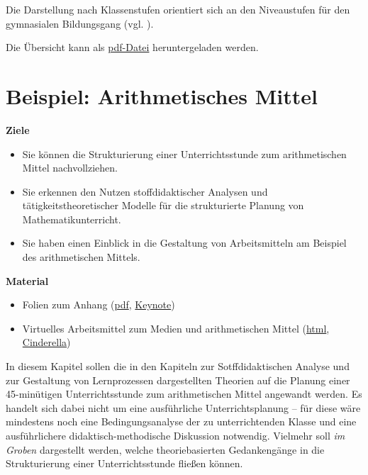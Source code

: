 \documentclass[
]{scrbook}
\providecommand{\tightlist}{%
  \setlength{\itemsep}{0pt}\setlength{\parskip}{0pt}}
\renewenvironment{quote}{
  \list{}{
	\leftmargin0.2cm   %
    \rightmargin\leftmargin
      	\def\FrameCommand
    {%
        {\color{quoteColor}\vrule width 2pt}%
        \hspace{0pt}%
    }%
    \MakeFramed{\advance \hsize -\width \FrameRestore}    \color{quoteColor}
    }
  \item\relax
}
{\endlist\color{black}\endMakeFramed}
\theoremstyle{definition}
\theoremstyle{definition}
\theoremstyle{definition}
\theoremstyle{definition}
\theoremstyle{remark}
\begin{document}
Die Darstellung nach Klassenstufen orientiert sich an den Niveaustufen für den gymnasialen Bildungsgang (vgl. ).

Die Übersicht kann als \href{files/Stoffdidaktik2024-SammlungLernbereiche.pdf}{pdf-Datei} heruntergeladen werden.

\chapter{Beispiel: Arithmetisches Mittel}\label{beispiel-arithmetisches-mittel}

\begin{quote}
\textbf{Ziele}

\begin{itemize}
\tightlist
\item
  Sie können die Strukturierung einer Unterrichtsstunde zum arithmetischen Mittel nachvollziehen.\\
\item
  Sie erkennen den Nutzen stoffdidaktischer Analysen und tätigkeitstheoretischer Modelle für die strukturierte Planung von Mathematikunterricht.\\
\item
  Sie haben einen Einblick in die Gestaltung von Arbeitsmitteln am
  Beispiel des arithmetischen Mittels.
\end{itemize}

\textbf{Material}

\begin{itemize}
\tightlist
\item
  Folien zum Anhang (\href{files/Stoffdidaktik2024-B-ArithmetischesMittel.pdf}{pdf}, \href{files/Stoffdidaktik2024-B-ArithmetischesMittel.key}{Keynote})
\item
  Virtuelles Arbeitsmittel zum Medien und arithmetischen Mittel (\href{files/Stoffdidaktik2024-B-Lagemasse.html}{html}, \href{files/Stoffdidaktik2024-B-Lagemasse.cdy}{Cinderella})
\end{itemize}
\end{quote}

In diesem Kapitel sollen die in den Kapiteln zur Sotffdidaktischen Analyse und zur Gestaltung von Lernprozessen dargestellten Theorien auf die Planung einer 45-minütigen Unterrichtsstunde zum arithmetischen Mittel angewandt werden. Es handelt sich dabei nicht um eine ausführliche Unterrichtsplanung -- für diese wäre mindestens noch eine Bedingungsanalyse der zu unterrichtenden Klasse und eine ausführlichere didaktisch-methodische Diskussion notwendig. Vielmehr soll \emph{im Groben} dargestellt werden, welche theoriebasierten Gedankengänge in die Strukturierung einer Unterrichtsstunde fließen können.
\end{document}
